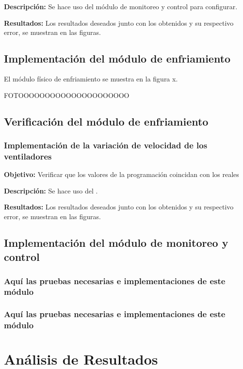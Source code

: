 \documentclass[14pt,oneside]{extarticle} %
\begin{document}
\textbf{Descripción:} Se hace uso del módulo de monitoreo y control para configurar.

\textbf{Resultados:} Los resultados deseados junto con los obtenidos y su respectivo error, se muestran en las figuras.

\subsection{Implementación del módulo de enfriamiento}
El módulo físico de enfriamiento se muestra en la figura x.

FOTOOOOOOOOOOOOOOOOOOOOO

\subsection{Verificación del módulo de enfriamiento}
\subsubsection{Implementación de la variación de velocidad de los ventiladores}
\textbf{Objetivo:} Verificar que los valores de la programación coincidan con los reales

\textbf{Descripción:} Se hace uso del .

\textbf{Resultados:} Los resultados deseados junto con los obtenidos y su respectivo error, se muestran en las figuras.

\subsection{Implementación del módulo de monitoreo y control}

\subsubsection{Aquí las pruebas necesarias e implementaciones de este módulo}
\subsubsection{Aquí las pruebas necesarias e implementaciones de este módulo}




\newpage
\clearpage

\section{Análisis de Resultados}
\end{document}
